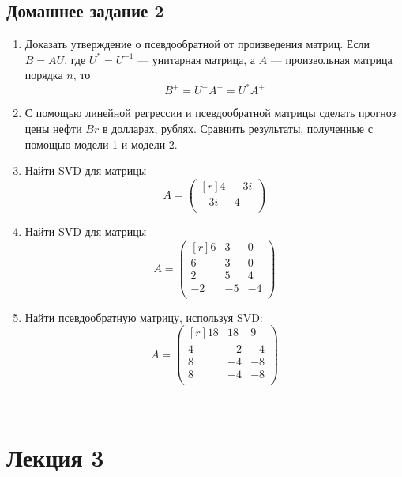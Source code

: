 \documentclass[12pt]{article}
\begin{document}
	\subsection{Домашнее задание 2}
	\begin{enumerate}
		\item
		Доказать утверждение о псевдообратной от произведения матриц.
		Если $B=AU$, где $U^*=U^{-1}$ --- унитарная матрица, а $A$ --- произвольная матрица порядка $n$, то $$B^+=U^+A^+=U^*A^+$$ 
		\item
		С помощью линейной регрессии и псевдообратной матрицы сделать прогноз цены нефти $Br$ в долларах, рублях. Сравнить результаты, полученные с помощью модели 1 и модели 2.
		\item
		Найти SVD для матрицы\\
		\[A=\begin{pmatrix}[r]
		4 & -3i\\
		-3i & 4\\
		\end{pmatrix}\]
		\item
		Найти SVD для матрицы\\
		\[A=\begin{pmatrix}[r]
		6 & 3 & 0\\
		6 & 3 & 0\\
		2 & 5 & 4\\
		-2 & -5 & -4\\
		\end{pmatrix}\]
		\item
		Найти псевдообратную матрицу, используя SVD:\\
		\[A=\begin{pmatrix}[r]
		18 & 18 & 9\\
		4 & -2 & -4\\
		8 & -4 & -8\\
		8 & -4 & -8\\
		\end{pmatrix}\]
	\end{enumerate}
	~\\
	
	\newpage
	\section{Лекция 3}
\end{document}
